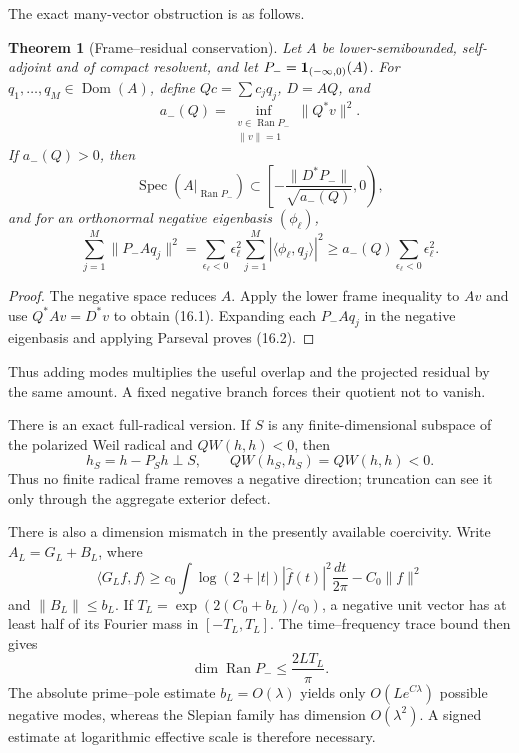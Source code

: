 \documentclass[11pt]{amsart}
\newtheorem{theorem}{Theorem}[section]
\theoremstyle{definition}
\theoremstyle{remark}
\newcommand{\Ran}{\operatorname{Ran}}
\newcommand{\Spec}{\operatorname{Spec}}
\begin{document}
The exact many-vector obstruction is as follows.

\begin{theorem}[Frame--residual conservation]
\label{thm:frame-residual}
Let \(A\) be lower-semibounded, self-adjoint and of compact resolvent, and
let \(P_-={\bf1}_{(-\infty,0)}(A)\).  For
\(q_1,\ldots,q_M\in\operatorname{Dom}(A)\), define
\(Qc=\sum c_jq_j\), \(D=AQ\), and
\[
 a_-(Q)=\inf_{\substack{v\in\Ran P_-\\\|v\|=1}}\|Q^*v\|^2.
\]
If \(a_-(Q)>0\), then
\[
 \Spec(A|_{\Ran P_-})
 \subset\left[-\frac{\|D^*P_-\|}{\sqrt{a_-(Q)}},0\right),
 \tag{16.1}
\]
and for an orthonormal negative eigenbasis \((\phi_\ell)\),
\[
 \boxed{
 \sum_{j=1}^M\|P_-Aq_j\|^2
 =\sum_{\epsilon_\ell<0}\epsilon_\ell^2
   \sum_{j=1}^M|\langle\phi_\ell,q_j\rangle|^2
 \ge a_-(Q)\sum_{\epsilon_\ell<0}\epsilon_\ell^2.}
 \tag{16.2}
\]
\end{theorem}

\begin{proof}
The negative space reduces \(A\).  Apply the lower frame inequality to
\(Av\) and use \(Q^*Av=D^*v\) to obtain (16.1).  Expanding each
\(P_-Aq_j\) in the negative eigenbasis and applying Parseval proves
(16.2).
\end{proof}

Thus adding modes multiplies the useful overlap and the projected residual
by the same amount.  A fixed negative branch forces their quotient not to
vanish.

There is an exact full-radical version.  If \(S\) is any finite-dimensional
subspace of the polarized Weil radical and \(QW(h,h)<0\), then
\[
 h_S=h-P_Sh\perp S,
 \qquad QW(h_S,h_S)=QW(h,h)<0.
\]
Thus no finite radical frame removes a negative direction; truncation can
see it only through the aggregate exterior defect.

There is also a dimension mismatch in the presently available coercivity.
Write \(A_L=G_L+B_L\), where
\[
 \langle G_Lf,f\rangle
 \ge c_0\int\log(2+|t|)|\widehat f(t)|^2\frac{dt}{2\pi}
      -C_0\|f\|^2
\]
and \(\|B_L\|\le b_L\).  If
\(T_L=\exp(2(C_0+b_L)/c_0)\), a negative unit vector has at least half of
its Fourier mass in \([-T_L,T_L]\).  The time--frequency trace bound then
gives
\[
 \dim\Ran P_-\le\frac{2LT_L}{\pi}.
 \tag{16.3}
\]
The absolute prime--pole estimate \(b_L=O(\lambda)\) yields only
\(O(Le^{C\lambda})\) possible negative modes, whereas the Slepian family
has dimension \(O(\lambda^2)\).  A signed estimate at logarithmic effective
scale is therefore necessary.
\end{document}
